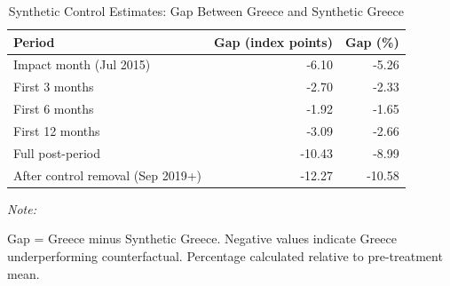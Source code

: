 \begin{table}[!h]
\centering
\caption{\label{tab:tab3}Synthetic Control Estimates: Gap Between Greece and Synthetic Greece}
\centering
\begin{threeparttable}
\begin{tabular}[t]{lrr}
\toprule
Period & Gap (index points) & Gap (\%)\\
\midrule
Impact month (Jul 2015) & -6.10 & -5.26\\
First 3 months & -2.70 & -2.33\\
First 6 months & -1.92 & -1.65\\
First 12 months & -3.09 & -2.66\\
Full post-period & -10.43 & -8.99\\
\addlinespace
After control removal (Sep 2019+) & -12.27 & -10.58\\
\bottomrule
\end{tabular}
\begin{tablenotes}
\item \textit{Note: } 
\item Gap = Greece minus Synthetic Greece. Negative values indicate Greece underperforming counterfactual. Percentage calculated relative to pre-treatment mean.
\end{tablenotes}
\end{threeparttable}
\end{table}
